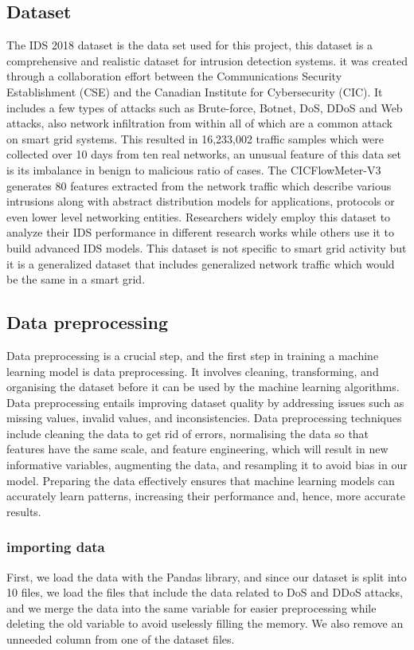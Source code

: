 \subsection{Dataset}\label{Dataset}
The IDS 2018 dataset is the data set used for this project, this dataset is a comprehensive and realistic dataset for intrusion detection systems. it was created through a collaboration effort between the Communications Security Establishment (CSE) and the Canadian Institute for Cybersecurity (CIC). It includes a few types of attacks such as Brute-force, Botnet, DoS, DDoS and Web attacks, also network infiltration from within all of which are a common attack on smart grid systems. This resulted in 16,233,002 traffic samples which were collected over 10 days from ten real networks, an unusual feature of this data set is its imbalance in benign to malicious ratio of cases. The CICFlowMeter-V3 generates 80 features extracted from the network traffic which describe various intrusions along with abstract distribution models for applications, protocols or even lower level networking entities. Researchers widely employ this dataset to analyze their IDS performance in different research works while others use it to build advanced IDS models. This dataset is not specific to smart grid activity but it is a generalized dataset that includes generalized network traffic which would be the same in a smart grid.




\subsection{Data preprocessing}
Data preprocessing is a crucial step, and the first step in training a machine learning model is data preprocessing. It involves cleaning, transforming, and organising the dataset before it can be used by the machine learning algorithms. Data preprocessing entails improving dataset quality by addressing issues such as missing values, invalid values, and inconsistencies. Data preprocessing techniques include cleaning the data to get rid of errors, normalising the data so that features have the same scale, and feature engineering, which will result in new informative variables, augmenting the data, and resampling it to avoid bias in our model. Preparing the data effectively ensures that machine learning models can accurately learn patterns, increasing their performance and, hence, more accurate results.



\subsubsection{importing data}
First, we load the data with the Pandas library, and since our dataset is split into 10 files, we load the files that include the data related to DoS and DDoS attacks, and we merge the data into the same variable for easier preprocessing while deleting the old variable to avoid uselessly filling the memory. We also remove an unneeded column from one of the dataset files.

